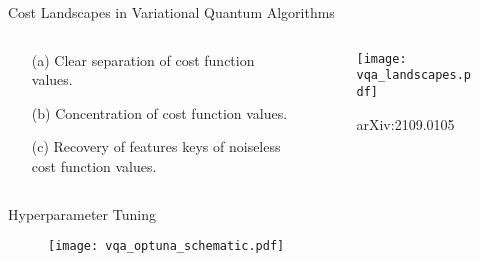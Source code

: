 \begin{frame}{Cost Landscapes in Variational Quantum Algorithms}
 \vspace{-5mm}
 \begin{columns}
    \begin{column}{0.5\linewidth}
      \begin{itemize}
        \item[(a)] Clear separation of cost function values.
        \item[(b)] Concentration of cost function values.
        \item[(c)] Recovery of features keys of noiseless cost function values.
      \end{itemize}
    \end{column}%
    \begin{column}{0.5\linewidth}
       \begin{figure}
          \centering
          \texttt{[image: vqa\_landscapes.pdf]}
          \caption*{arXiv:2109.0105}
        \end{figure}
    \end{column}

  \end{columns}
\end{frame}


\begin{frame}{Hyperparameter Tuning}
   \vspace*{-4mm}
   \begin{figure}
      \centering
      \texttt{[image: vqa\_optuna\_schematic.pdf]}
    \end{figure}
\end{frame}
